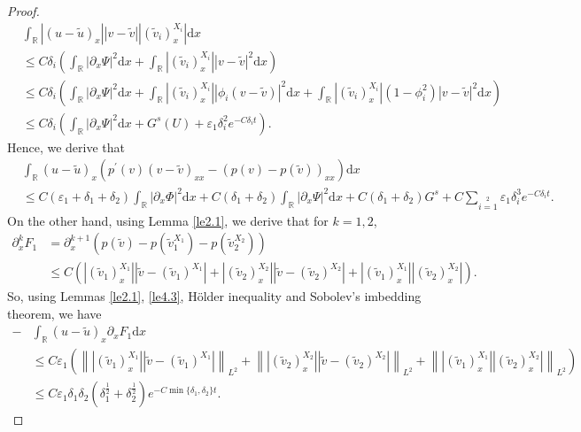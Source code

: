 \documentclass[10pt,reqno]{amsart}
\numberwithin{equation}{section}
\newcommand{\dif}{\mathrm{d}}
\begin{document}
\begin{proof}
\begin{align*}
&\int_\mathbb{R}|(u-\widetilde{u})_{x}||v-\widetilde{v}||(\widetilde{v}_i)^{X_i}_{x}|\dif x\\
&\le C\delta_i\left(\int_\mathbb{R}|\partial_{x}\Psi|^2\dif x
+\int_\mathbb{R}|(\widetilde{v}_i)^{X_i}_{x}||v-\widetilde{v}|^2\dif x\right)\\
&\le  C\delta_i\left(\int_\mathbb{R}|\partial_{x}\Psi|^2\dif x
+\int_\mathbb{R}|(\widetilde{v}_i)^{X_i}_{x}||\phi_i(v-\widetilde{v})|^2\dif x
+\int_\mathbb{R}|(\widetilde{v}_i)^{X_i}_{x}|(1-\phi_i^2)|v-\widetilde{v}|^2\dif x\right)\\
&\le C\delta_i\left(\int_\mathbb{R}|\partial_{x}\Psi|^2\dif x
+G^s(U)
+\varepsilon_1 \delta_i^2e^{-C\delta_i t}\right).
\end{align*}
Hence, we derive that
\begin{align*}
 &\int_\mathbb{R}(u-\widetilde{u})_{x}(p^{\prime}(v)(v-\widetilde{v})_{xx}-(p(v)-p(\widetilde{v}))_{xx})\dif x\\
  &\le C(\varepsilon_1+\delta_1+\delta_2)\int_\mathbb{R}|\partial_{x}\Phi|^2\dif x
  +C(\delta_1+\delta_2)\int_\mathbb{R}|\partial_{x}\Psi|^2\dif x
  +C(\delta_1+\delta_2)G^s+C\sum\limits_{i=1}\limits^2\varepsilon_1 \delta_i^3e^{-C\delta_i t}.
\end{align*}
On the other hand, using Lemma \ref{le2.1}, we derive that for $k=1,2$,
\begin{align*}
\partial_x^{k}F_1&=
\partial_x^{k+1}\left(p(\widetilde{v})-p(\widetilde{v}_1^{X_1})-p(\widetilde{v}_2^{X_2})\right)\\
&\le
C\left(|(\widetilde{v}_1)^{X_1}_x||\widetilde{v}-(\widetilde{v}_1)^{X_1}|
+|(\widetilde{v}_2)^{X_2}_x||\widetilde{v}-(\widetilde{v}_2)^{X_2}|
+|(\widetilde{v}_1)^{X_1}_x||(\widetilde{v}_2)^{X_2}_x|\right).
\end{align*}
So, using Lemmas \ref{le2.1}, \ref{le4.3}, H\"{o}lder inequality and Sobolev's imbedding theorem, we have
\begin{align*}
-&\int_{\mathbb{R}}(u-\widetilde{u})_{x}\partial_{x}F_1\dif x\\
&\le C\varepsilon_1 \left(\left\||(\widetilde{v}_1)^{X_1}_x||\widetilde{v}-(\widetilde{v}_1)^{X_1}|\right\|_{L^2}
+\left\||(\widetilde{v}_2)^{X_2}_x||\widetilde{v}-(\widetilde{v}_2)^{X_2}|\right\|_{L^2}
+\left\||(\widetilde{v}_1)^{X_1}_x||(\widetilde{v}_2)^{X_2}_x|\right\|_{L^2}\right)\\
&\le C\varepsilon_1\delta_1\delta_2(\delta_1^{\frac{1}{2}}+\delta_2^{\frac{1}{2}})
e^{-C\min\{\delta_1,\delta_2\}t}.
\end{align*}

\end{proof}
\end{document}
